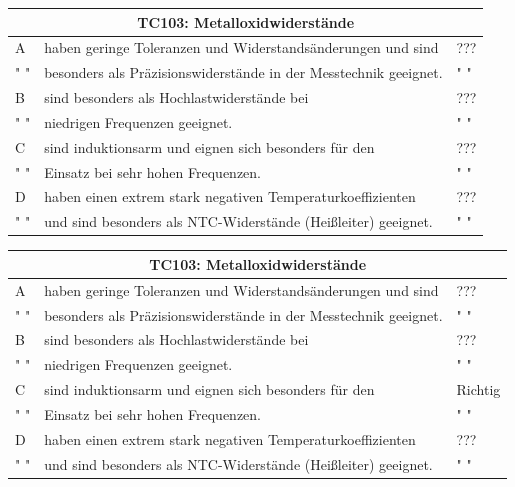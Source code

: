 \begin{frame}
	\begin{scriptsize}	
	\begin{tabular}{|l|l|l|}
	\hline
		\multicolumn{3}{|c|}{\textbf{TC103:} Metalloxidwiderstände}\\
		\hline
		A &haben geringe Toleranzen und Widerstandsänderungen und sind & ??? \\
		" " & besonders als Präzisionswiderstände in der Messtechnik geeignet. & " " \\ \hline
		B & sind besonders als Hochlastwiderstände bei & ??? \\
		" " &niedrigen Frequenzen geeignet. & " "\\ \hline
		C & sind induktionsarm und eignen sich besonders für den& ??? \\ 
		" " &  Einsatz bei sehr hohen Frequenzen. & " " \\ \hline
		D & haben einen extrem stark negativen Temperaturkoeffizienten & ??? \\ 
		" " & und sind besonders als NTC-Widerstände (Heißleiter) geeignet. & " " \\ \hline 		
	\end{tabular}
	\end{scriptsize}
\end{frame}\begin{frame}
	\begin{scriptsize}	
	\begin{tabular}{|l|l|l|}
	\hline
		\multicolumn{3}{|c|}{\textbf{TC103:} Metalloxidwiderstände}\\
		\hline
		A &haben geringe Toleranzen und Widerstandsänderungen und sind& ??? \\
		" " & besonders als Präzisionswiderstände in der Messtechnik geeignet.& " " \\ \hline
		B & sind besonders als Hochlastwiderstände bei & ??? \\
		" " &niedrigen Frequenzen geeignet. & " "\\ \hline
		C &sind induktionsarm und eignen sich besonders für den& Richtig \\ 
		" " &  Einsatz bei sehr hohen Frequenzen. & " " \\ \hline
		D & haben einen extrem stark negativen Temperaturkoeffizienten& ??? \\ 
		" " & und sind besonders als NTC-Widerstände (Heißleiter) geeignet.& " " \\ \hline 		
	\end{tabular}
	\end{scriptsize}
\end{frame}

